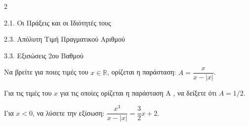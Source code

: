 \begin{ylh}{2}
    \item 2.1. Οι Πράξεις και οι Ιδιότητές τους
    \item 2.3. Απόλυτη Τιμή Πραγματικού Αριθμού
    \item 3.3. Εξισώσεις 2ου Βαθμού
\end{ylh}

\begin{alist}
\item
\begin{rlist}
\item Να βρείτε για ποιες τιμές του $x \in \mathbb{R}$, ορίζεται η παράσταση: $A = \dfrac{x}{x-|x|}$. 
\item Για τις τιμές του $x$ για τις οποίες ορίζεται η παράσταση A , να δείξετε ότι $A = 1/2$. 
\end{rlist}
\item Για $x < 0$, να λύσετε την εξίσωση: $\dfrac{x^3}{x-|x|} = \dfrac{3}{2}x+2$. 
\end{alist}

